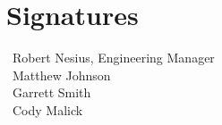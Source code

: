 \documentclass[10pt,onecolumn,journal,draftclsnofoot]{IEEEtran}
\begin{document}
\section{Signatures}
\vspace{2cm}
\begin{flushleft}
	\noindent\hspace{0.7cm}\makebox[1.5in]{\hrulefill}~Robert Nesius, Engineering Manager\\
	\vspace{1cm}
	\hspace{0.7cm}\makebox[1.5in]{\hrulefill}~Matthew Johnson\\
	\vspace{1cm}
	\hspace{0.7cm}\makebox[1.5in]{\hrulefill}~Garrett Smith\\
	\vspace{1cm}
	\hspace{0.7cm}\makebox[1.5in]{\hrulefill}~Cody Malick
\end{flushleft}
\end{document}
